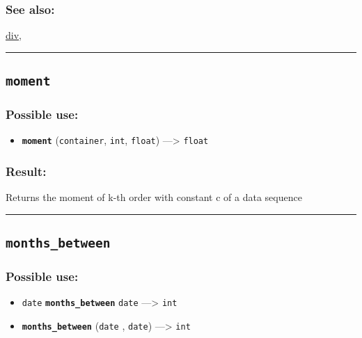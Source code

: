\documentclass[]{book}
\providecommand{\tightlist}{%
  \setlength{\itemsep}{0pt}\setlength{\parskip}{0pt}}
\theoremstyle{definition}
\theoremstyle{definition}
\theoremstyle{definition}
\theoremstyle{remark}
\begin{document}
\subsubsection{See also:}\label{see-also-143}

\href{operators-d-to-h.html\#div}{div},

\begin{center}\rule{0.5\linewidth}{\linethickness}\end{center}

\subsection{\texorpdfstring{\texttt{moment}}{moment}}\label{moment}

\subsubsection{Possible use:}\label{possible-use-361}

\begin{itemize}
\tightlist
\item
  \textbf{\texttt{moment}} (\texttt{container}, \texttt{int},
  \texttt{float}) ---\textgreater{} \texttt{float}
\end{itemize}

\subsubsection{Result:}\label{result-350}

Returns the moment of k-th order with constant c of a data sequence

\begin{center}\rule{0.5\linewidth}{\linethickness}\end{center}

\subsection{\texorpdfstring{\texttt{months\_between}}{months\_between}}\label{months_between}

\subsubsection{Possible use:}\label{possible-use-362}

\begin{itemize}
\tightlist
\item
  \texttt{date} \textbf{\texttt{months\_between}} \texttt{date}
  ---\textgreater{} \texttt{int}
\item
  \textbf{\texttt{months\_between}} (\texttt{date} , \texttt{date})
  ---\textgreater{} \texttt{int}
\end{itemize}
\end{document}
